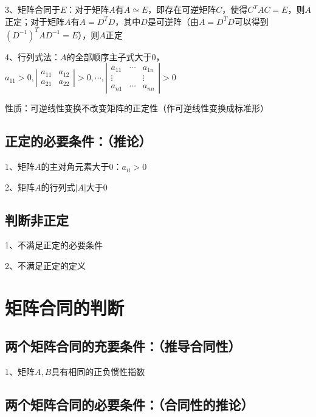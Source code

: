 3、矩阵合同于$E$：对于矩阵$A$有$A \simeq E$，即存在可逆矩阵$C$，使得$C^TAC=E$，则$A$正定；对于矩阵$A$有$A=D^TD$，其中$D$是可逆阵（由$A=D^TD$可以得到$(D^{-1})^TAD^{-1}=E$），则$A$正定

4、行列式法：$A$的全部顺序主子式大于0，$a_{11}>0,\left|\begin{array}{ll}a_{11} & a_{12} \\a_{21} & a_{22}\end{array}\right|>0, \cdots,\left|\begin{array}{ccc}a_{11} & \cdots & a_{1 n} \\\vdots & & \vdots \\a_{n 1} & \cdots & a_{n n}\end{array}\right|>0$

性质：可逆线性变换不改变矩阵的正定性（作可逆线性变换成标准形）



\subsection{正定的必要条件：（推论）}

1、矩阵$A$的主对角元素大于0：$a_{ii} > 0$

2、矩阵$A$的行列式$|A|$大于0



\subsection{判断非正定}

1、不满足正定的必要条件

2、不满足正定的定义

\section{矩阵合同的判断}



\subsection{两个矩阵合同的充要条件：（推导合同性）}

1、矩阵$A,B$具有相同的正负惯性指数



\subsection{两个矩阵合同的必要条件：（合同性的推论）}

